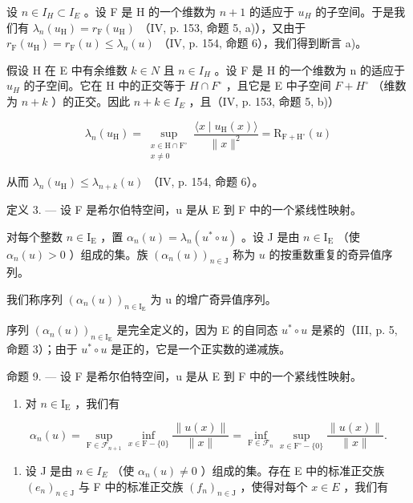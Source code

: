设 \(n \in I_{H} \subset I_{E}\) 。设 F 是 H 的一个维数为 \(n + 1\) 的适应于 \(u_{H}\) 的子空间。于是我们有 \(\lambda_{n}(u_{\mathrm{H}}) = r_{\mathrm{F}}(u_{\mathrm{H}})\) （IV, p. 153, 命题 5, a)），又由于 \(r_{\mathrm{F}}(u_{\mathrm{H}}) = r_{\mathrm{F}}(u) \leqslant \lambda_{n}(u)\) （IV, p. 154, 命题 6），我们得到断言 a)。

假设 H 在 E 中有余维数 \(k \in N\) 且 \(n \in I_{H}\) 。设 F 是 H 的一个维数为 n 的适应于 \(u_{H}\) 的子空间。它在 H 中的正交等于 \(H \cap F^{\circ}\) ，且它是 E 中子空间 \(F + H^{\circ}\) （维数为 \(n + k\) ）的正交。因此 \(n + k \in I_{E}\) ，且（IV, p. 153, 命题 5, b)）

\[
\lambda_{n}(u_{\mathrm{H}}) = \sup_{\substack{x\in \mathrm{H}\cap \mathrm{F}^{\circ}\\ x\neq 0}}\frac{\langle x\mid u_{\mathrm{H}}(x)\rangle}{\|x\|^{2}} = \mathrm{R}_{\mathrm{F} + \mathrm{H}^{\circ}}(u)
\]

从而 \(\lambda_{n}(u_{\mathrm{H}})\leqslant \lambda_{n + k}(u)\) （IV, p. 154, 命题 6）。

定义 3. --- 设 F 是希尔伯特空间，u 是从 E 到 F 中的一个紧线性映射。

对每个整数 \(n \in \mathrm{I}_{\mathrm{E}}\) ，置 \(\alpha_{n}(u) = \lambda_{n}(u^{*} \circ u)\) 。设 J 是由 \(n \in \mathrm{I}_{\mathrm{E}}\) （使 \(\alpha_{n}(u) > 0\) ）组成的集。族 \((\alpha_{n}(u))_{n \in \mathrm{J}}\) 称为 \(u\) 的按重数重复的奇异值序列。

我们称序列 \((\alpha_{n}(u))_{n\in\mathrm{I}_{\mathrm{E}}}\) 为 u 的增广奇异值序列。

序列 \((\alpha_{n}(u))_{n\in\mathrm{I}_{\mathrm{E}}}\) 是完全定义的，因为 E 的自同态 \(u^{*}\circ u\) 是紧的（III, p. 5, 命题 3）；由于 \(u^{*}\circ u\) 是正的，它是一个正实数的递减族。

命题 9. --- 设 F 是希尔伯特空间，u 是从 E 到 F 中的一个紧线性映射。

\begin{enumerate}
\def\labelenumi{\alph{enumi})}
\tightlist
\item
  对 \(n \in \mathrm{I}_{\mathrm{E}}\) ，我们有
\end{enumerate}

\[
\alpha_ {n} (u) = \sup _ {\mathrm{F} \in \mathscr {F} _ {n + 1}} \inf _ {x \in \mathrm{F} - \{0 \}} \frac {\| u (x) \|}{\| x \|} = \inf _ {\mathrm{F} \in \mathscr {F} _ {n}} \sup _ {x \in \mathrm{F} ^ {\circ} - \{0 \}} \frac {\| u (x) \|}{\| x \|}.
\]

\begin{enumerate}
\def\labelenumi{\alph{enumi})}
\setcounter{enumi}{1}
\tightlist
\item
  设 J 是由 \(n \in I_{E}\) （使 \(\alpha_{n}(u) \neq 0\) ）组成的集。存在 E 中的标准正交族 \((e_{n})_{n \in \mathrm{J}}\) 与 F 中的标准正交族 \((f_{n})_{n \in \mathrm{J}}\) ，使得对每个 \(x \in E\) ，我们有
\end{enumerate}

